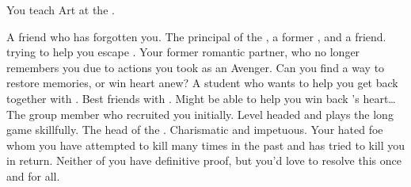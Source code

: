 \documentclass[char]{GL2020}
\begin{document}
\begin{itemz}[Notes]
	\item You teach Art at the \pSchool{}.
\end{itemz}

\begin{contacts}
	\contact{\cLibrarian{}} A friend who has forgotten you.
	\contact{\cPrincipal{}} The principal of the \pSchool{}, a former \pShippie{}, and a friend. \cPrincipal{\They} \cPrincipal{\are} trying to help you escape \cGenesis{}.
\contact{\cHeadScientist{}} Your former romantic partner, who no longer remembers you due to actions you took as an Avenger. Can you find a way to restore \cHeadScientist{\their} memories, or win \cHeadScientist{\their} heart anew?
\contact{\cInitiate{}} A \pShippie{} student who wants to help you get back together with \cHeadScientist{}.
	\contact{\cChupInventor{}} Best friends with \cHeadScientist{}. Might be able to help you win back \cHeadScientist{}’s heart\ldots
\contact{\cChupSecond{}} The group member who recruited you initially. Level headed and plays the long game skillfully.
	\contact{\cChupLeader{}}The head of the \pGoaties{}. Charismatic and impetuous.
	\contact{\cDiplomat{}} Your hated foe whom you have attempted to kill many times in the past and has tried to kill you in return. Neither of you have definitive proof, but you’d love to resolve this once and for all.
\end{contacts}
\end{document}
